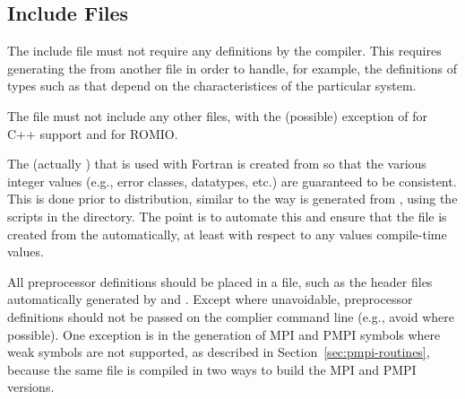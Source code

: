 \documentclass{article}
\begin{document}
\subsection{Include Files}
The include file  must not require any 
definitions by the compiler.  This requires generating the
 from another file in order to handle, for example, the
definitions of types such as  that depend on the
characteristices of the particular system.

The  file must not include any other
files, with the (possible) exception of  for C++
support and  for ROMIO.

The  (actually ) that is used with Fortran is
created from 
 so that the various integer values (e.g., error classes, 
datatypes, etc.) are guaranteed to be consistent.  This is done prior to
distribution, similar to the way  is generated from
, using the scripts  in the
 directory.  The point is to automate this and
ensure that the  file
is created from the  automatically, at least with
respect to any values compile-time values.


All preprocessor definitions should be placed in a file, such as the
header files automatically generated by
 and .  Except
where unavoidable, preprocessor definitions should not be passed on
the complier command line (e.g., avoid  where
possible). One exception is in the generation of MPI and PMPI symbols
where weak symbols are not supported, as described in
Section~\ref{sec:pmpi-routines}, because the same file is compiled in
two ways to build the MPI and PMPI versions.

\end{document}
